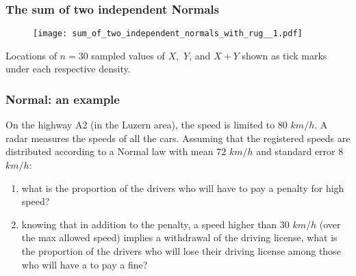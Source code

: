 \documentclass[notes=show,smaller,handout]{beamer}\usepackage[]{graphicx}\usepackage[]{color}
\begin{document}
\begin{frame}%

\frametitle{The sum of two independent Normals}


\begin{figure}[ptb]\centering
\texttt{[image: sum\_of\_two\_independent\_normals\_with\_rug\_\_1.pdf]}%
\end{figure}


Locations of $n=30$ sampled values of $X,$ $Y$, and $X+Y$ shown as tick marks under each respective density.

\end{frame}%


\begin{frame}%

\frametitle{Normal: an example}

\begin{example}

On the highway A2 (in the Luzern area), the speed is limited to $80$ $km/h$. A radar measures the speeds of all the cars.
Assuming that the registered speeds are distributed according to a Normal law with mean $72$ $km/h$ and standard error $8$ $km/h$: \vspace{0.2cm}
\begin{enumerate}
  \item what is the proportion of the drivers who will have to pay a penalty for high speed? \vspace{0.2cm}
  \item knowing that in addition to the penalty, a speed higher than $30$ $km/h$ (over the max allowed speed) implies a withdrawal of the driving license, what is the proportion of the drivers who  will lose their driving license among those who will have a to pay a fine?
\end{enumerate}

\end{example}
\end{frame}
\end{document}
